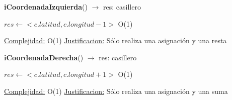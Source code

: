 \begin{Algoritmos}
\begin{algorithm}[H]{\textbf{iCoordenadaIzquierda}() $\to$ res: casillero}
	\begin{algorithmic}[1]
		\State $res \gets <c.latitud, c.longitud - 1>$ \Comment O(1)
		
		\medskip
		\Statex \underline{Complejidad:} O(1)
			\Statex \underline{Justificacion:} Sólo realiza una asignación y una resta
	\end{algorithmic}
\end{algorithm}


\begin{algorithm}[H]{\textbf{iCoordenadaDerecha}() $\to$ res: casillero}
	\begin{algorithmic}[1]
		\State $res \gets <c.latitud, c.longitud + 1>$ \Comment O(1)
		
		\medskip
		\Statex \underline{Complejidad:} O(1)
			\Statex \underline{Justificacion:} Sólo realiza una asignación y una suma
	\end{algorithmic}
\end{algorithm}

\end{Algoritmos}